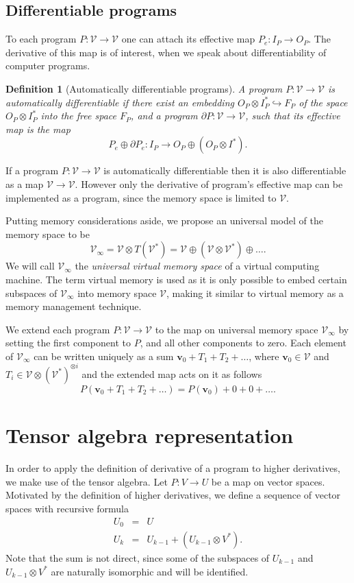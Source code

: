\documentclass[preprint,12pt]{elsarticle}
\newcommand{\VV}{\mathcal{V}}
\newcommand{\vv}{\mathbf{v}}
\newcommand{\D}{\partial}
\newtheorem{definicija}{Definition}[section]
\begin{document}
\subsection{Differentiable programs}
To each program $P:\VV\to \VV$ one can attach its effective map $P_e:I_P\to
O_P$. The derivative of this map is of interest, when we speak about
differentiability of computer programs. 
\begin{definicija}[Automatically differentiable programs]
  A program $P:\VV\to \VV$ is \emph{automatically differentiable} if there exist an embedding
  $O_P\otimes I_P^*\hookrightarrow F_P$ of the space $O_P\otimes I_P^*$ into
  the free space $F_P$, and a program $\D P:\VV\to \VV$, such that its effective
  map is the map
  \begin{equation}
    \label{eq:program_derivative}
    P_e\oplus \D P_e:I_P\rightarrow O_P\oplus (O_P\otimes I^*).
  \end{equation}
\end{definicija}

If a program $P:\VV\to \VV$ is automatically differentiable then it is also
differentiable as a map $\VV\to\VV$. However only the derivative of program's
effective map can be implemented as a program, since the memory space is limited to $\VV$. 

Putting memory considerations aside, we propose an universal model of the memory
space to be 
$$\VV_\infty = \VV\otimes T(\VV^*) = \VV\oplus
(\VV\otimes\VV^*)\oplus\ldots.$$
We will call $\VV_\infty$ the \emph{universal virtual memory space} of a virtual computing machine. The term virtual memory is used as it is
only possible to embed certain subspaces of $\VV_\infty$ into memory space $\VV$, making it similar to
virtual memory as a memory management technique.  

We extend each program $P:\VV\to \VV$ to the map on universal memory space $\VV_\infty$ by setting the first component to $P$,
and all other components to zero. Each element of $\VV_\infty$ can be written
uniquely as a sum $\vv_0+T_1+T_2+\ldots$, where $\vv_0\in\VV$ and 
$T_i\in\VV\otimes (\VV^*)^{\otimes i}$ and the extended map acts on it as follows   
\begin{equation}
  \label{eq:extension}
  P(\vv_0+T_1+T_2+\ldots)=P(\vv_0)+0+0+\ldots.
\end{equation}

\section{Tensor algebra representation}
In order to apply the definition of derivative of a program to higher
derivatives, we make use of the tensor algebra.
Let $P:V\to U$ be a map on vector spaces. Motivated by the definition of higher
derivatives, we define a sequence of vector spaces with
recursive formula
\begin{eqnarray}
  \label{eq:universal_space}
  U_0 &=& U\\
  U_k &=& U_{k-1}+\left(U_{k-1}\otimes V^*\right).
\end{eqnarray}
Note that the sum is not direct, since some of the subspaces of $U_{k-1}$ and
$U_{k-1}\otimes V^*$ are naturally isomorphic and will be identified.
\end{document}
